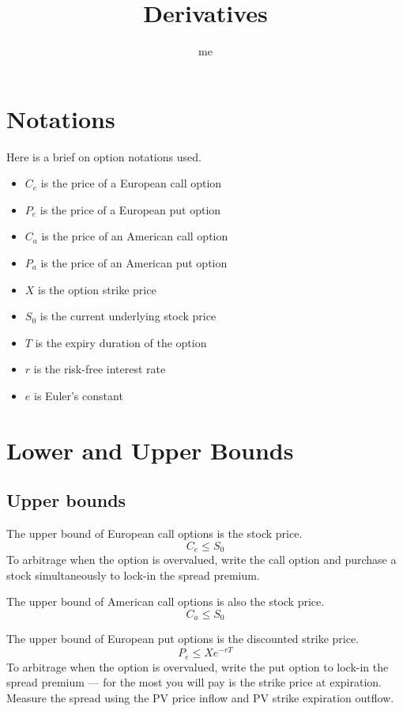 \documentclass[a4paper,10pt]{article}
\title{Derivatives}
\author{me}
\begin{document}
\maketitle

\newpage

\begin{multicols*}{2}

\section{Notations}
Here is a brief on option notations used.
\begin{itemize}
    \item $C_e$ is the price of a European call option
    \item $P_e$ is the price of a European put option
    \item $C_a$ is the price of an American call option
    \item $P_a$ is the price of an American put option
    \item $X$ is the option strike price
    \item $S_0$ is the current underlying stock price
    \item $T$ is the expiry duration of the option
    \item $r$ is the risk-free interest rate
    \item $e$ is Euler's constant
\end{itemize}



\section{Lower and Upper Bounds}

\subsection{Upper bounds}
The upper bound of European call options is the stock price.
\[
    C_e \leq S_0
\]
To arbitrage when the option is overvalued, write the call option and purchase a stock simultaneously to lock-in the spread premium.

The upper bound of American call options is also the stock price.
\[
    C_a \leq S_0
\]

The upper bound of European put options is the discounted strike price.
\[
    P_e \leq X e^{-rT}
\]
To arbitrage when the option is overvalued, write the put option to lock-in the spread premium --- for the most you will pay is the strike price at expiration. Measure the spread using the PV price inflow and PV strike expiration outflow.


\end{multicols*}
\end{document}
